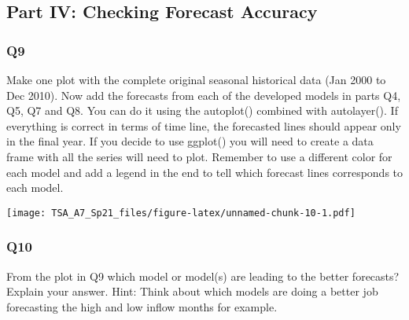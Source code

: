 \documentclass[
]{article}
\newenvironment{Shaded}{\begin{snugshade}}{\end{snugshade}}
\newcommand{\FunctionTok}[1]{\textcolor[rgb]{0.00,0.00,0.00}{#1}}
\newcommand{\NormalTok}[1]{#1}
\newcommand{\OtherTok}[1]{\textcolor[rgb]{0.56,0.35,0.01}{#1}}
\newcommand{\SpecialCharTok}[1]{\textcolor[rgb]{0.00,0.00,0.00}{#1}}
\newcommand{\StringTok}[1]{\textcolor[rgb]{0.31,0.60,0.02}{#1}}
\begin{document}
\hypertarget{part-iv-checking-forecast-accuracy}{%
\subsection{Part IV: Checking Forecast
Accuracy}\label{part-iv-checking-forecast-accuracy}}

\hypertarget{q9}{%
\subsubsection{Q9}\label{q9}}

Make one plot with the complete original seasonal historical data (Jan
2000 to Dec 2010). Now add the forecasts from each of the developed
models in parts Q4, Q5, Q7 and Q8. You can do it using the autoplot()
combined with autolayer(). If everything is correct in terms of time
line, the forecasted lines should appear only in the final year. If you
decide to use ggplot() you will need to create a data frame with all the
series will need to plot. Remember to use a different color for each
model and add a legend in the end to tell which forecast lines
corresponds to each model.

\begin{Shaded}
\end{Shaded}

\texttt{[image: TSA\_A7\_Sp21\_files/figure-latex/unnamed-chunk-10-1.pdf]}

\hypertarget{q10}{%
\subsubsection{Q10}\label{q10}}

From the plot in Q9 which model or model(s) are leading to the better
forecasts? Explain your answer. Hint: Think about which models are doing
a better job forecasting the high and low inflow months for example.
\end{document}
